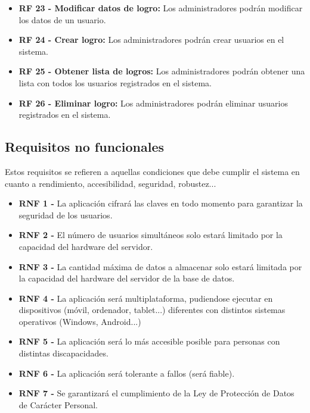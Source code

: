 \begin{itemize}
\begin{itemize}
              \item \textbf{RF 23 - Modificar datos de logro: }Los administradores podrán modificar los datos de un usuario.
              \item \textbf{RF 24 - Crear logro: }Los administradores podrán crear usuarios en el sistema.
              \item \textbf{RF 25 - Obtener lista de logros: } Los administradores podrán obtener una lista con todos los usuarios registrados en el sistema.
              \item \textbf{RF 26 - Eliminar logro: }Los administradores podrán eliminar usuarios registrados en el sistema.
          \end{itemize}
\end{itemize}

\subsection{Requisitos no funcionales}
Estos requisitos se refieren a aquellas condiciones que debe cumplir el sistema en cuanto a rendimiento, accesibilidad, seguridad, robustez...
\begin{itemize}
    \item \textbf{RNF 1 - } La aplicación cifrará las claves en todo momento para garantizar la seguridad de los usuarios.
    \item \textbf{RNF 2 - } El número de usuarios simultáneos solo estará limitado por la capacidad del hardware del servidor.
    \item \textbf{RNF 3 - } La cantidad máxima de datos a almacenar solo estará limitada por la capacidad del hardware del servidor de la base de datos.
    \item \textbf{RNF 4 - } La aplicación será multiplataforma, pudiendose ejecutar en dispositivos (móvil, ordenador, tablet...) diferentes con distintos sistemas operativos (Windows, Android...)
    \item \textbf{RNF 5 - } La aplicación será lo más accesible posible para personas con distintas discapacidades. 
    \item \textbf{RNF 6 - } La aplicación será tolerante a fallos (será fiable).
    \item \textbf{RNF 7 - } Se garantizará el cumplimiento de la Ley de Protección de Datos de Carácter Personal.
\end{itemize}



